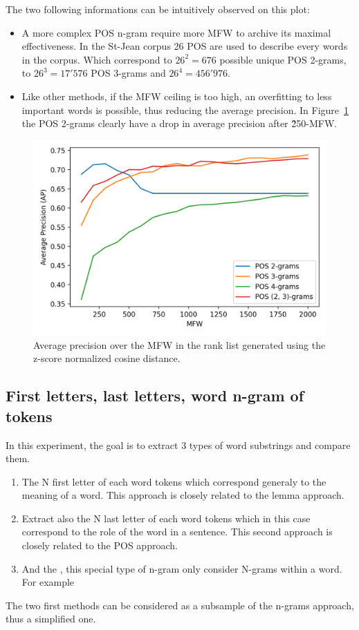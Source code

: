 The two following informations can be intuitively observed on this plot:

\begin{itemize}
  \item
  A more complex POS n-gram require more MFW to archive its maximal effectiveness.
  In the St-Jean corpus 26 POS are used to describe every words in the corpus.
  Which correspond to $26^2 = 676$ possible unique POS 2-grams, to $26^3 = 17'576$ POS 3-grams and $26^4 = 456'976$.
  \item
  Like other methods, if the MFW ceiling is too high, an overfitting to less important words is possible, thus reducing the average precision.
  In Figure~\ref{fig:pos_ngrams} the POS 2-grams clearly have a drop in average precision after \~250-MFW.
\end{itemize}

\begin{figure}
  \includegraphics[width=\linewidth]{img/pos_ngrams.png}
  \caption{Average precision over the MFW in the rank list generated using the z-score normalized cosine distance.}
  \label{fig:pos_ngrams}
\end{figure}

\subsection{First letters, last letters, word n-gram of tokens}

In this experiment, the goal is to extract 3 types of word substrings and compare them.

\begin{enumerate}
  \item
  The N first letter of each word tokens which correspond generaly to the meaning of a word.
  This approach is closely related to the lemma approach.
  \item
  Extract also the N last letter of each word tokens which in this case correspond to the role of the word in a sentence.
  This second approach is closely related to the POS approach.
  \item
  And the , this special type of n-gram only consider N-grams within a word.
  For example
\end{enumerate}
The two first methods can be considered as a subsample of the n-grams approach, thus a simplified one.

